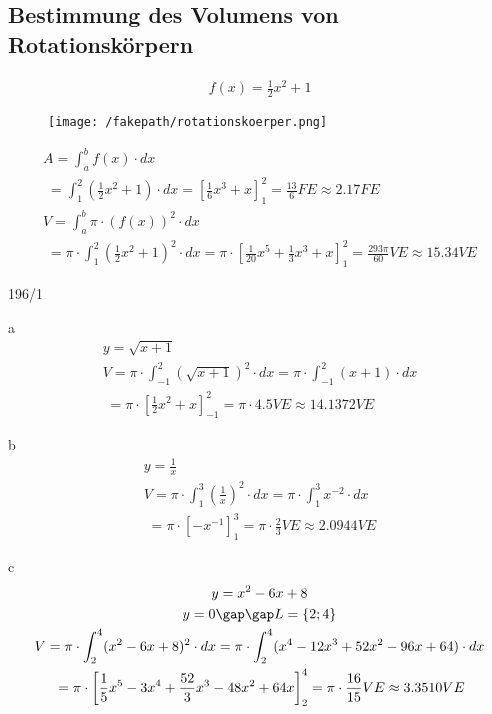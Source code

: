 \subsection{Bestimmung des Volumens von Rotationskörpern}
\begin{gather*}
  f(x) = \frac{1}{2}x^2 + 1
\end{gather*}
\begin{figure}[H]
  \centering
  \texttt{[image: /fakepath/rotationskoerper.png]}
\end{figure}
\begin{gather*}
  A = \int_a^b f(x) \cdot dx \\
  \;= \int_1^2 (\frac{1}{2}x^2 + 1) \cdot dx = \left[\frac{1}{6}x^3 + x\right]_1^2 = \frac{13}{6} FE \approx 2.17FE \\
  V = \int_a^b \pi \cdot (f(x))^2 \cdot dx \\
  \;= \pi \cdot \int_1^2 (\frac{1}{2}x^2 + 1)^2 \cdot dx = \pi \cdot \left[\frac{1}{20}x^5 + \frac{1}{3}x^3 + x\right]_1^2 = \frac{293\pi}{60}VE \approx 15.34VE
\end{gather*}
\newpage
\begin{exercise}{196/1}
  \item [a]
  \begin{gather*}
    y = \sqrt{x + 1} \\
    V = \pi \cdot \int_{-1}^2 (\sqrt{x + 1})^2 \cdot dx = \pi \cdot \int_{-1}^2 (x + 1) \cdot dx \\
    \;= \pi \cdot \left[\frac{1}{2}x^2 + x\right]_{-1}^2 = \pi \cdot 4.5VE \approx 14.1372VE
  \end{gather*}
  \item [b]
  \begin{gather*}
    y = \frac{1}{x} \\
    V = \pi \cdot \int_1^3 (\frac{1}{x})^2 \cdot dx = \pi \cdot \int_1^3 x^{-2} \cdot dx \\
    \;= \pi \cdot \left[-x^{-1}\right]_1^3 = \pi \cdot \frac{2}{3}VE \approx 2.0944VE
  \end{gather*}
  \item [c]
  \begin{gather*}
    y = x^2 - 6x + 8 \\
    y = 0 \gap\gap L = \{2; 4\} \\
    V = \pi \cdot \int_2^4 (x^2 - 6x + 8)^2 \cdot dx = \pi \cdot \int_2^4 (x^4 - 12x^3 + 52x^2 - 96x + 64) \cdot dx \\
    \;= \pi \cdot \left[\frac{1}{5}x^5 - 3x^4 + \frac{52}{3}x^3 - 48x^2 + 64x\right]_2^4 = \pi \cdot \frac{16}{15}VE \approx 3.3510VE
  \end{gather*}
\end{exercise}
